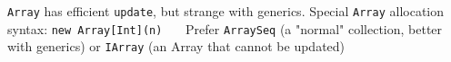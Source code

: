 \documentclass[article, a5paper]{memoir}
\newcommand{\code}{\lstinline[basicstyle=\ttfamily]}
\begin{document}
\vspace{-0.75em} 
{\small \texttt{Array} has efficient \code{update}, but strange with generics. Special \code{Array} allocation syntax: \code{new Array[Int](n)}  ~~~Prefer \code{ArraySeq} (a "normal" collection, better with generics) or \code{IArray} (an Array that cannot be updated)}



\clearpage
\end{document}
